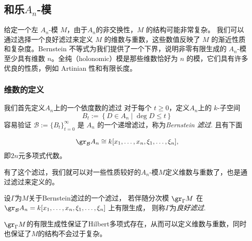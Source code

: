 \subsection{和乐$A_n$-模}
给定一个左 $A_n$-模 $M$，由于$A_n$的非交换性，$M$ 的结构可能非常复杂。
我们可以通过选择一个良好滤过来定义 $M$ 的维数与重数，这些数值反映了 $M$ 的渐近性质和复杂度。Bernstein 不等式为我们提供了一个下界，说明非零有限生成的 $A_n$-模至少具有维数 $n$。全纯（holonomic）模是那些维数恰好为 $n$ 的模，它们具有许多优良的性质，例如 Artinian 性和有限长度。


\subsubsection{维数的定义}

我们首先定义$A_n$上的一个依度数的滤过
对于每个 $t\ge0$，定义$A_n$上的 $k$-子空间
\begin{equation*}
    B_t:=\left\{D\in A_n\mid \deg D\leq t\right\}
\end{equation*}
容易验证 $\mathcal{B}:=\{B_t\}_{t=0}^\infty$ 是 $A_n$ 的一个递增滤过，称为\emph{Bernstein 滤过}.
且有下面
\begin{proposition}
    \begin{equation*}
        \gr_{\mathcal{B}}A_n\cong k[x_1,\dots,x_n,\xi_1,\dots,\xi_n],
    \end{equation*}
    即$2n$元多项式代数。
\end{proposition}
有了这个滤过，我们就可以对一些性质较好的$A_n$-模$M$定义维数与重数了，也是通过滤过来定义的。


\begin{definition}
    设$\Gamma$为$M$关于Bernstein滤过的一个滤过，
    若伴随分次模 $\gr_\Gamma M$
    在 $\gr_{\mathcal{B}}A_n=k[x_1,\dots,x_n,\xi_1,\dots,\xi_n]$ 上有限生成，
    则称$\Gamma$为\emph{良好滤过}.
\end{definition}
$\gr_{\Gamma}M$的有限生成性保证了Hilbert多项式存在，从而可以定义维数与重数，同时也保证了$M$的结构不会过于复杂。

